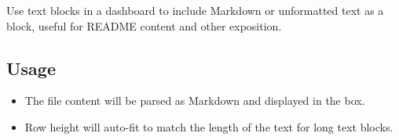 Use text blocks in a dashboard to include Markdown or unformatted text
as a block, useful for README content and other exposition.

\hypertarget{usage}{%
\subsection{Usage}\label{usage}}

\begin{Shaded}
\begin{Highlighting}[]
\KeywordTok{:}
\AttributeTok{  }\KeywordTok{:}
\AttributeTok{    }\KeywordTok{:}
\AttributeTok{    }\KeywordTok{:}\AttributeTok{ }
\AttributeTok{    }\KeywordTok{:}\AttributeTok{ }
\AttributeTok{    }\KeywordTok{:}\AttributeTok{ }
\end{Highlighting}
\end{Shaded}

\begin{itemize}
\tightlist
\item
  The file content will be parsed as Markdown and displayed in the box.
\item
  Row height will auto-fit to match the length of the text for long text
  blocks.
\end{itemize}
